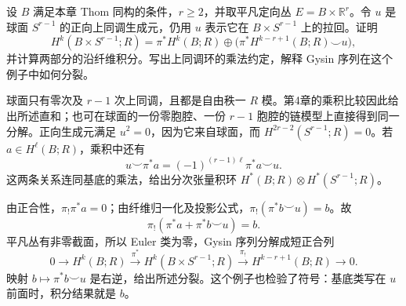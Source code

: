 \begin{exercise}\label{g2:ex:gysin-product-normalization}
	设 \(B\) 满足本章 Thom 同构的条件，\(r\ge2\)，并取平凡定向丛 \(E=B\times\mathbb R^r\)。令 \(u\) 是球面 \(S^{r-1}\) 的正向上同调生成元，仍用 \(u\) 表示它在 \(B\times S^{r-1}\) 上的拉回。证明
	\[
		H^k(B\times S^{r-1};R)=\pi^*H^k(B;R)\oplus\bigl(\pi^*H^{k-r+1}(B;R)\smile u\bigr),
	\]
	并计算两部分的沿纤维积分。写出上同调环的乘法约定，解释 Gysin 序列在这个例子中如何分裂。
\end{exercise}
\begin{solution}
	球面只有零次及 \(r-1\) 次上同调，且都是自由秩一 \(R\) 模。第4章的乘积比较因此给出所述直和；也可在球面的一份零胞腔、一份 \(r-1\) 胞腔的链模型上直接得到同一分解。正向生成元满足 \(u^2=0\)，因为它来自球面，而 \(H^{2r-2}(S^{r-1};R)=0\)。若 \(a\in H^\ell(B;R)\)，乘积中还有
	\[
		u\smile\pi^*a=(-1)^{(r-1)\ell}\pi^*a\smile u.
	\]
	这两条关系连同基底的乘法，给出分次张量积环 \(H^*(B;R)\otimes H^*(S^{r-1};R)\)。

	由正合性，\(\pi_!\pi^*a=0\)；由纤维归一化及投影公式，\(\pi_!(\pi^*b\smile u)=b\)。故
	\[
		\pi_!(\pi^*a+\pi^*b\smile u)=b.
	\]
	平凡丛有非零截面，所以 Euler 类为零，Gysin 序列分解成短正合列
	\[
		0\longrightarrow H^k(B;R)\xrightarrow{\pi^*}H^k(B\times S^{r-1};R)\xrightarrow{\pi_!}H^{k-r+1}(B;R)\longrightarrow0.
	\]
	映射 \(b\mapsto\pi^*b\smile u\) 是右逆，给出所述分裂。这个例子也检验了符号：基底类写在 \(u\) 前面时，积分结果就是 \(b\)。
\end{solution}


